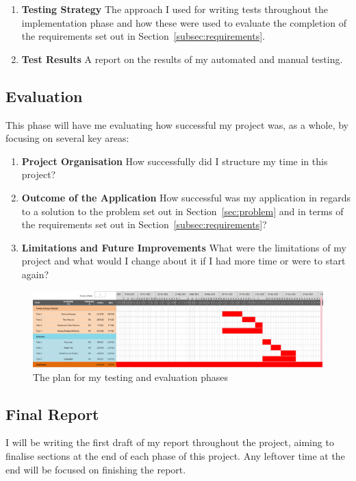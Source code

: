 \begin{enumerate}
  \item \textbf{Testing Strategy} The approach I used for writing tests throughout the implementation phase and how these were used to evaluate the completion of the requirements set out in Section~\ref{subsec:requirements}. 
  \item \textbf{Test Results} A report on the results of my automated and manual testing.
\end{enumerate}

\subsection*{Evaluation}
This phase will have me evaluating how successful my project was, as a whole, by focusing on several key areas:

\begin{enumerate}
  \item \textbf{Project Organisation} How successfully did I structure my time in this project?
  \item \textbf{Outcome of the Application} How successful was my application in regards to a solution to the problem set out in Section~\ref{sec:problem} and in terms of the requirements set out in Section~\ref{subsec:requirements}?
  \item \textbf{Limitations and Future Improvements} What were the limitations of my project and what would I change about it if I had more time or were to start again?
\end{enumerate}

\begin{figure}[ht]
  \centering
  \includegraphics[width=\textwidth]{assets/images/charts/gantt/testing-evaluation.png}
  \caption{The plan for my testing and evaluation phases}
  \label{fig:final-gantt}
\end{figure}

\subsection*{Final Report}

I will be writing the first draft of my report throughout the project, aiming to finalise sections at the end of each phase of this project. Any leftover time at the end will be focused on finishing the report.

